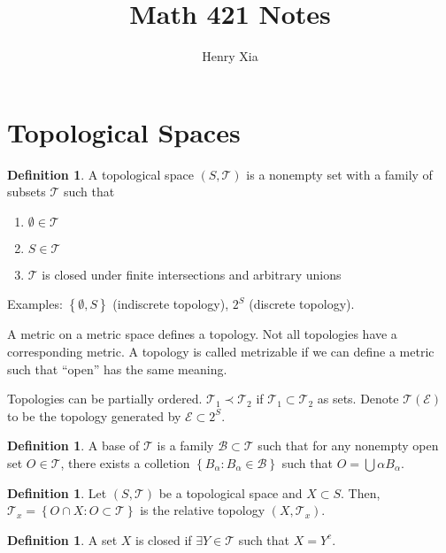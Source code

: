 \documentclass[11pt]{article}
\title{Math 421 Notes}
\author{Henry Xia}
\theoremstyle{definition}
\newtheorem{defn}[thm]{Definition}
\newcommand{\set}[1]{\left\{ #1 \right\}}
\newcommand{\m}[1]{\mathcal{#1}}
\begin{document}
\maketitle

\tableofcontents


\section{Topological Spaces}

\begin{defn} A topological space $(S,\m{T})$ is a nonempty set with a family of subsets
$\m{T}$ such that
\begin{enumerate}
  \item $\emptyset\in\m{T}$
  \item $S\in\m{T}$
  \item $\m{T}$ is closed under finite intersections and arbitrary unions
\end{enumerate}
\end{defn}

Examples: $\set{\emptyset,S}$ (indiscrete topology), $2^S$ (discrete topology).

A metric on a metric space defines a topology. Not all topologies have a corresponding
metric. A topology is called metrizable if we can define a metric such that ``open'' has
the same meaning.

Topologies can be partially ordered. $\m{T}_1\prec\m{T}_2$ if $\m{T}_1\subset\m{T}_2$ as
sets. Denote $\m{T}(\m{E})$ to be the topology generated by $\m{E}\subset 2^S$.

\begin{defn}
A base of $\m{T}$ is a family $\m{B}\subset\m{T}$ such that for any nonempty open set
$O\in\m{T}$, there exists a colletion $\set{B_\alpha:B_\alpha\in\m{B}}$ such that
$O=\bigcup\alpha B_\alpha$.
\end{defn}

\begin{defn}
Let $(S,\m{T})$ be a topological space and $X\subset S$. Then, $\m{T}_x=\set{O\cap X:
O\subset\m{T}}$ is the relative topology $(X,\m{T}_x)$.
\end{defn}

\begin{defn}
A set $X$ is closed if $\exists Y\in\m{T}$ such that $X=Y^c$.
\end{defn}
\end{document}
